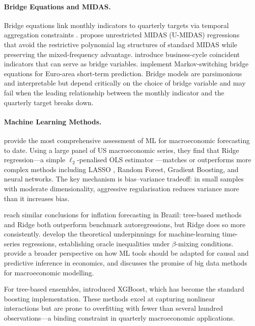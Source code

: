 \paragraph{Bridge Equations and MIDAS.}
Bridge equations link monthly indicators to quarterly targets via temporal aggregation constraints \citep{baffigi2004bridge}.  \citet{foroni2015unrestricted} propose unrestricted MIDAS (U-MIDAS) regressions that avoid the restrictive polynomial lag structures of standard MIDAS while preserving the mixed-frequency advantage.  \citet{mariano2003new} introduce business-cycle coincident indicators that can serve as bridge variables.  \citet{camacho2013introducing} implement Markov-switching bridge equations for Euro-area short-term prediction.  Bridge models are parsimonious and interpretable but depend critically on the choice of bridge variable and may fail when the leading relationship between the monthly indicator and the quarterly target breaks down.

\paragraph{Machine Learning Methods.}
\citet{gouletcoulombe2022how} provide the most comprehensive assessment of ML for macroeconomic forecasting to date.  Using a large panel of US macroeconomic series, they find that Ridge regression---a simple $\ell_2$-penalised OLS estimator \citep{hoerl1970ridge}---matches or outperforms more complex methods including LASSO \citep{tibshirani1996regression}, Random Forest, Gradient Boosting, and neural networks.  The key mechanism is bias--variance tradeoff: in small samples with moderate dimensionality, aggressive regularisation reduces variance more than it increases bias.

\citet{medeiros2021forecasting} reach similar conclusions for inflation forecasting in Brazil: tree-based methods and Ridge both outperform benchmark autoregressions, but Ridge does so more consistently.  \citet{babii2022machine} develop the theoretical underpinnings for machine-learning time-series regressions, establishing oracle inequalities under $\beta$-mixing conditions.  \citet{athey2019machine} provide a broader perspective on how ML tools should be adapted for causal and predictive inference in economics, and \citet{varian2014big} discusses the promise of big data methods for macroeconomic modelling.

For tree-based ensembles, \citet{chen2016xgboost} introduced XGBoost, which has become the standard boosting implementation.  These methods excel at capturing nonlinear interactions but are prone to overfitting with fewer than several hundred observations---a binding constraint in quarterly macroeconomic applications.

